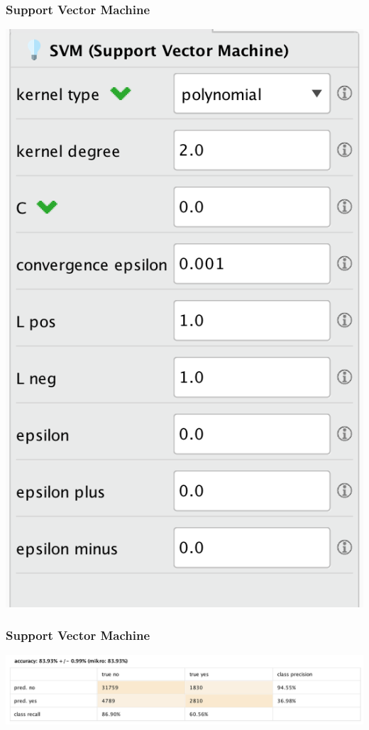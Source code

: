 \documentclass{beamer}
\begin{document}
\begin{frame}
	\frametitle{Support Vector Machine}
  \includegraphics[width=\textwidth,height=\textheight,keepaspectratio]{svm-opt}
\end{frame}

\begin{frame}
	\frametitle{Support Vector Machine}
  \includegraphics[width=\textwidth,height=\textheight,keepaspectratio]{svm}
\end{frame}
\end{document}
